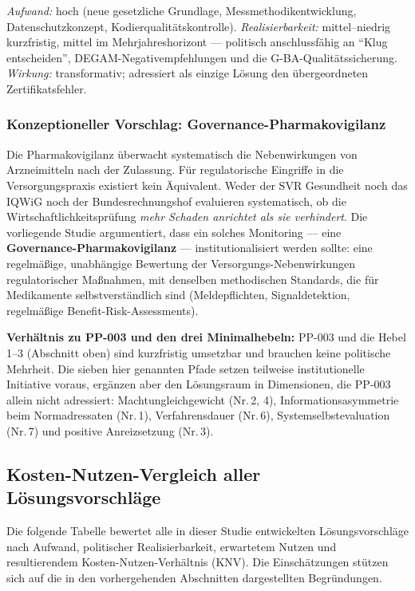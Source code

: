 \documentclass{umbruch-position}
\begin{document}
\textit{Aufwand:} hoch (neue gesetzliche Grundlage, Messmethodik\-entwicklung, Datenschutz\-konzept, Kodier\-qualitäts\-kontrolle). \textit{Realisierbarkeit:} mittel--niedrig kurzfristig, mittel im Mehrjahreshorizont --- politisch anschluss\-fähig an ``Klug entscheiden'', DEGAM-Negativ\-empfehlungen und die G-BA-Qualitätssicherung. \textit{Wirkung:} transformativ; adressiert als einzige Lösung den übergeordneten Zertifikatsfehler.

\subsubsection{Konzeptioneller Vorschlag: Governance-Pharmakovigilanz}

Die Pharmakovigilanz überwacht systematisch die Nebenwirkungen von Arzneimitteln nach der Zulassung. Für regulatorische Eingriffe in die Versorgungspraxis existiert kein Äquivalent. Weder der SVR Gesundheit noch das IQWiG noch der Bundesrechnungshof evaluieren systematisch, ob die Wirtschaftlichkeitsprüfung \textit{mehr Schaden anrichtet als sie verhindert}. Die vorliegende Studie argumentiert, dass ein solches Monitoring --- eine \textbf{Governance-Pharmakovigilanz} --- institutionalisiert werden sollte: eine regelmäßige, unabhängige Bewertung der Versorgungs-Nebenwirkungen regulatorischer Maßnahmen, mit denselben methodischen Standards, die für Medikamente selbstverständlich sind (Meldepflichten, Signaldetektion, regelmäßige Benefit-Risk-Assessments).

\medskip
\noindent \textbf{Verhältnis zu PP-003 und den drei Minimalhebeln:} PP-003 und die Hebel 1--3 (Abschnitt oben) sind kurzfristig umsetzbar und brauchen keine politische Mehrheit. Die sieben hier genannten Pfade setzen teilweise institutionelle Initiative voraus, ergänzen aber den Lösungsraum in Dimensionen, die PP-003 allein nicht adressiert: Machtungleichgewicht (Nr.\,2, 4), Informationsasymmetrie beim Normadressaten (Nr.\,1), Verfahrensdauer (Nr.\,6), Systemselbstevaluation (Nr.\,7) und positive Anreizsetzung (Nr.\,3).

\subsection{Kosten-Nutzen-Vergleich aller Lösungsvorschläge}

Die folgende Tabelle bewertet alle in dieser Studie entwickelten Lösungsvorschläge nach Aufwand, politischer Realisierbarkeit, erwartetem Nutzen und resultierendem Kosten-Nutzen-Verhältnis (KNV). Die Einschätzungen stützen sich auf die in den vorhergehenden Abschnitten dargestellten Begründungen.
\end{document}
